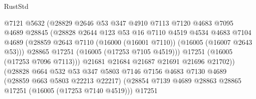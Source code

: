 \begin{lexlean}{RustStd}
\begin{coremodule}
                                  @7121
                                  @5632
                                  (@28829
                                    @2646
                                    @53
                                    @347
                                    @4910
                                    @7113
                                    @7120
                                    @4683
                                    @7095
                                    @4689
                                    @28845
                                    (@28828
                                      @2644
                                      @123
                                      @53
                                      @16
                                      @7110
                                      @4519
                                      @4534
                                      @4683
                                      @7104
                                      @4689
                                      (@28859
                                        @2643
                                        @7110
                                        (@16000 (@16001 @7110))
                                        (@16005 (@16007 @2643 @53)))
                                      @28865
                                      @17251
                                      (@16005 (@17253 @7105 @4519)))
                                    @17251
                                    (@16005 (@17253 @7096 @7113)))
                                  @21681
                                  @21684
                                  @21687
                                  @21691
                                  @21696
                                  @21702))
                              (@28828
                                @664
                                @532
                                @53
                                @347
                                @5803
                                @7146
                                @7156
                                @4683
                                @7130
                                @4689
                                (@28859 @663 @5803 @22213 @22217)
                                (@28854
                                  @7139
                                  @4689
                                  @28863
                                  @28865
                                  @17251
                                  (@16005 (@17253 @7140 @4519)))
                                @17251

\end{coremodule}
\end{lexlean}
